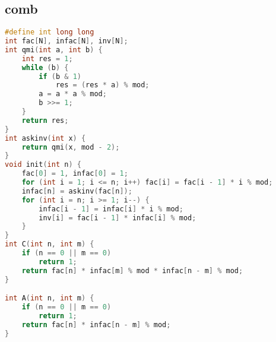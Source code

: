 \subsection{comb}
\begin{lstlisting}[language=C++]
#define int long long
int fac[N], infac[N], inv[N];
int qmi(int a, int b) {
    int res = 1;
    while (b) {
        if (b & 1)
            res = (res * a) % mod;
        a = a * a % mod;
        b >>= 1;
    }
    return res;
}
int askinv(int x) {
    return qmi(x, mod - 2);
}
void init(int n) {
    fac[0] = 1, infac[0] = 1;
    for (int i = 1; i <= n; i++) fac[i] = fac[i - 1] * i % mod;
    infac[n] = askinv(fac[n]);
    for (int i = n; i >= 1; i--) {
        infac[i - 1] = infac[i] * i % mod;
        inv[i] = fac[i - 1] * infac[i] % mod;
    }
}
int C(int n, int m) {
    if (n == 0 || m == 0)
        return 1;
    return fac[n] * infac[m] % mod * infac[n - m] % mod;
}

int A(int n, int m) {
    if (n == 0 || m == 0)
        return 1;
    return fac[n] * infac[n - m] % mod;
}
\end{lstlisting}
